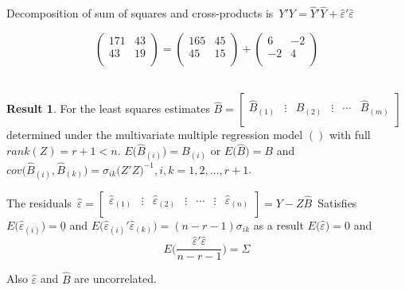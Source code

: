 \documentclass[11pt,a4paper]{article}
\theoremstyle{definition}
\newtheorem{result}[thm]{Result}
\begin{document}
Decomposition of sum of squares and cross-products is 
\,$Y'Y = \widehat{Y}'\hat{Y} + \widehat{\varepsilon}'\widehat{\varepsilon}$

$$
\begin{pmatrix}
171 & 43\\
43 & 19\\
\end{pmatrix}
 =
\begin{pmatrix}
165 & 45\\
45 & 15\\
\end{pmatrix} +
\begin{pmatrix}
6 & -2\\
-2 & 4\\
\end{pmatrix}
$$\\











\begin{result}
For the least squares estimates \quad $\widehat{B} = \begin{bmatrix}
\widehat{B}_{(1)} & \vdots & \widehat{B}_{(2)} & \vdots & \cdots& \widehat{B}_{(m)}\\
\end{bmatrix}
$\,
determined under the multivariate multiple regression model $()$ with full $rank(Z)=r+1<n$. $E\big(\widehat{B}_{(i)}\big) = B_{(i)}$ or $E\big(\widehat{B}\big) = B$ and $cov\big(\widehat{B}_{(i)},\widehat{B}_{(k)}\big)=\sigma_{ik}\big(Z'Z\big)^{-1},  i,k=1,2,\ldots,r+1$.\\
\end{result}

The residuals
\,$ \widehat{\varepsilon} = 
\begin{bmatrix}
\widehat{\varepsilon}_{(1)} & \vdots & \widehat{\varepsilon}_{(2)} & \vdots & \cdots& \vdots & \widehat{\varepsilon}_{(n)}\\
\end{bmatrix}
=Y-Z\widehat{B}$\,
Satisfies $E\big(\widehat{\varepsilon}_{(i)}\big)=\underline{0}$ and $E\big(\widehat{\varepsilon}_{(i)}'\widehat{\varepsilon}_{(k)}\big)=(n-r-1)\sigma_{ik}$ as a result  $E\big(\widehat{\varepsilon}\big)=0$ and $$E\Bigg(\frac{\widehat{\varepsilon}'\widehat{\varepsilon}}{n-r-1}\Bigg)=\Sigma$$


Also $\widehat{\varepsilon}$ and $\widehat{B}$ are uncorrelated.\\\\
\end{document}
